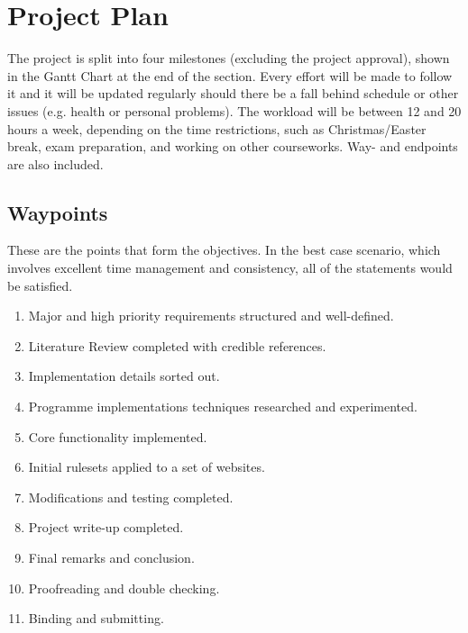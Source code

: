 \documentclass[a4paper, 12pt, titlepage]{article}
\begin{document}

\section{Project Plan}
The project is split into four milestones (excluding the project approval), shown in the Gantt Chart at the end of the section. Every effort will be made to follow it and it will be updated regularly should there be a fall behind schedule or other issues (e.g. health or personal problems). The workload will be between 12 and 20 hours a week, depending on the time restrictions, such as Christmas/Easter break, exam preparation, and working on other courseworks. Way- and endpoints are also included.

\subsection{Waypoints}
These are the points that form the objectives. In the best case scenario, which involves excellent time management and consistency, all of the statements would be satisfied.
\begin{enumerate}
\item{Major and high priority requirements structured and well-defined.}
\item{Literature Review completed with credible references.}
\item{Implementation details sorted out.}
\item{Programme implementations techniques researched and experimented.}
\item{Core functionality implemented.}
\item{Initial rulesets applied to a set of websites.}
\item{Modifications and testing completed.}
\item{Project write-up completed.}
\item{Final remarks and conclusion.}
\item{Proofreading and double checking.}
\item{Binding and submitting.}
\end{enumerate}
\end{document}
